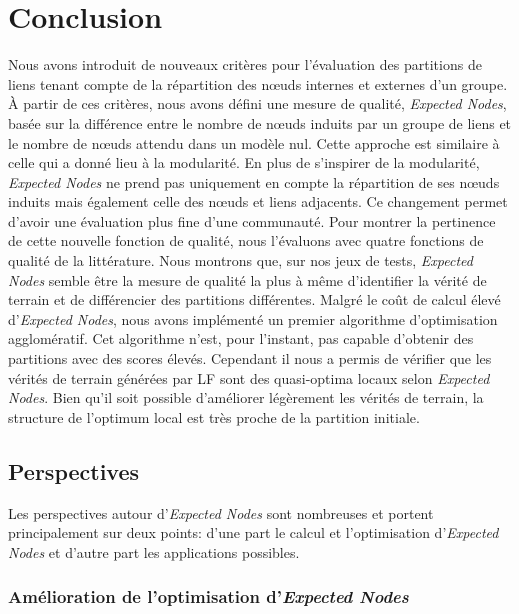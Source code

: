\section{Conclusion}

Nous avons introduit de nouveaux critères pour l'évaluation des partitions de liens tenant compte de la répartition des n\oe{}uds internes et externes d'un groupe.
\`A partir de ces critères, nous avons défini une mesure de qualité, \emph{Expected Nodes}, basée sur la différence entre le nombre de n\oe{}uds induits par un groupe de liens et le nombre de n\oe{}uds attendu dans un modèle nul.
Cette approche est similaire à celle qui a donné lieu à la modularité.
En plus de s'inspirer de la modularité, \emph{Expected Nodes} ne prend pas uniquement en compte la répartition de ses n\oe{}uds induits mais également celle des n\oe{}uds et liens adjacents.
Ce changement permet d'avoir une évaluation plus fine d'une communauté.
Pour montrer la pertinence de cette nouvelle fonction de qualité, nous l'évaluons avec quatre fonctions de qualité de la littérature.
Nous montrons que, sur nos jeux de tests, \emph{Expected Nodes} semble être la mesure de qualité la plus à même d'identifier la vérité de terrain et de différencier des partitions différentes.
Malgré le coût de calcul élevé d'\emph{Expected Nodes}, nous avons implémenté un premier algorithme d'optimisation agglomératif.
Cet algorithme n'est, pour l'instant, pas capable d'obtenir des partitions avec des scores élevés.
Cependant il nous a permis de vérifier que les vérités de terrain générées par LF sont des quasi-optima locaux selon \emph{Expected Nodes}.
Bien qu'il soit possible d'améliorer légèrement les vérités de terrain, la structure de l'optimum local est très proche de la partition initiale.


\subsection{Perspectives}

Les perspectives autour d'\emph{Expected Nodes} sont nombreuses et portent principalement sur deux points: d'une part le calcul et l'optimisation d'\emph{Expected Nodes} et d'autre part les applications possibles.

\subsubsection{Amélioration de l'optimisation d'\emph{Expected Nodes}}

